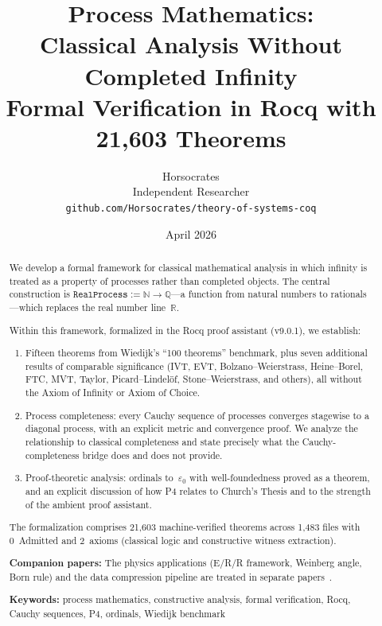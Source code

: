\documentclass[11pt,a4paper]{article}
\theoremstyle{definition}
\theoremstyle{remark}
\newcommand{\RP}{\texttt{RealProcess}}
\newcommand{\natQ}{\mathbb{N} \to \mathbb{Q}}
\begin{document}
\title{%
  \textbf{Process Mathematics:\\
  Classical Analysis Without Completed Infinity}\\[0.5em]
  \large Formal Verification in Rocq with 21,603 Theorems
}

\author{
  Horsocrates\\
  \small Independent Researcher\\
  \small \texttt{github.com/Horsocrates/theory-of-systems-coq}
}

\date{April 2026}

\maketitle

\begin{abstract}
We develop a formal framework for classical mathematical analysis in which infinity is treated as a property of processes rather than completed objects.
The central construction is $\RP := \natQ$---a function from natural numbers to rationals---which replaces the real number line~$\mathbb{R}$.

Within this framework, formalized in the Rocq proof assistant (v9.0.1), we establish:
\begin{enumerate}[nosep]
\item Fifteen theorems from Wiedijk's ``100 theorems'' benchmark, plus seven additional results of comparable significance (IVT, EVT, Bolzano--Weierstrass, Heine--Borel, FTC, MVT, Taylor, Picard--Lindel\"of, Stone--Weierstrass, and others), all without the Axiom of Infinity or Axiom of Choice.
\item Process completeness: every Cauchy sequence of processes converges stagewise to a diagonal process, with an explicit metric and convergence proof.  We analyze the relationship to classical completeness and state precisely what the Cauchy-completeness bridge does and does not provide.
\item Proof-theoretic analysis: ordinals to~$\varepsilon_0$ with well-foundedness proved as a theorem, and an explicit discussion of how P4 relates to Church's Thesis and to the strength of the ambient proof assistant.
\end{enumerate}

\noindent
The formalization comprises 21,603 machine-verified theorems across 1,483 files with 0~Admitted and 2~axioms (classical logic and constructive witness extraction).

\medskip\noindent
\textbf{Companion papers:} The physics applications (E/R/R framework, Weinberg angle, Born rule) and the data compression pipeline are treated in separate papers~\cite{physics_paper,compression_paper}.

\medskip\noindent
\textbf{Keywords:} process mathematics, constructive analysis, formal verification, Rocq, Cauchy sequences, P4, ordinals, Wiedijk benchmark
\end{abstract}
\end{document}

